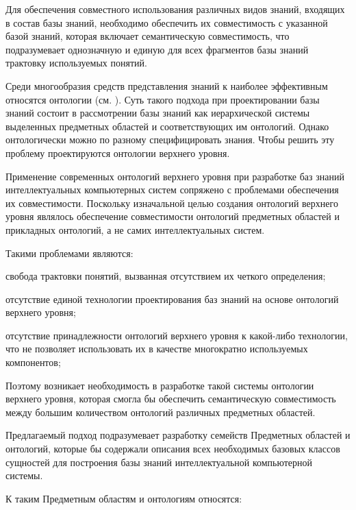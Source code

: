 Для обеспечения совместного использования различных видов знаний, входящих в состав базы знаний, необходимо обеспечить их совместимость с указанной базой знаний, которая включает семантическую совместимость, что подразумевает однозначную и единую для всех фрагментов базы знаний трактовку используемых понятий.

Среди многообразия средств представления знаний к наиболее эффективным относятся онтологии (см. ). Суть такого подхода при проектировании базы знаний состоит в рассмотрении базы знаний как иерархической системы выделенных предметных областей и соответствующих им онтологий. Однако онтологически можно по разному специфицировать знания. Чтобы решить эту проблему проектируются онтологии верхнего уровня.

Применение современных онтологий верхнего уровня при разработке баз знаний интеллектуальных компьютерных систем сопряжено с проблемами обеспечения их совместимости. Поскольку изначальной целью создания онтологий верхнего уровня являлось обеспечение  совместимости онтологий предметных областей и прикладных онтологий, а не самих интеллектуальных систем. 

Такими проблемами являются:
\begin{textitemize}
    \item свобода трактовки понятий, вызванная отсутствием их четкого определения;
    \item отсутствие единой технологии проектирования баз знаний на основе онтологий верхнего уровня;
    \item отсутствие принадлежности онтологий верхнего уровня к какой-либо технологии, что не позволяет использовать их в качестве многократно используемых компонентов;
\end{textitemize}

Поэтому возникает необходимость в разработке такой системы онтологии верхнего уровня, которая смогла бы обеспечить семантическую совместимость между большим количеством онтологий различных предметных областей.

Предлагаемый подход подразумевает разработку семейств Предметных областей и онтологий, которые бы содержали описания всех необходимых базовых классов сущностей для построения базы знаний интеллектуальной компьютерной системы.

К таким Предметным областям и онтологиям относятся:

